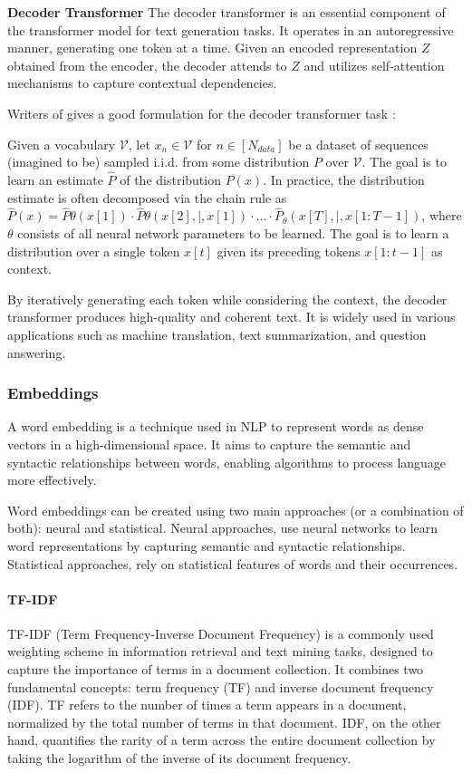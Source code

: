 \documentclass[a4paper,12pt]{article}
\begin{document}
\textbf{Decoder Transformer}
The decoder transformer is an essential component of the transformer model for text generation tasks. It operates in an autoregressive manner, generating one token at a time. Given an encoded representation $Z$ obtained from the encoder, 
the decoder attends to $Z$ and utilizes self-attention mechanisms to capture contextual dependencies.

Writers of \cite{formaltransformer} gives a good formulation for the decoder transformer task : 

Given a vocabulary $\mathcal{V}$, let $x_n \in \mathcal{V}$ for $n \in [N_{data}]$ be a dataset of sequences (imagined to be) sampled i.i.d. from some distribution $P$ over $\mathcal{V}$. 
The goal is to learn an estimate $\hat{P}$ of the distribution $P(x)$. 
In practice, the distribution estimate is often decomposed via the chain rule as $\hat{P}(x) = \hat{P}{\theta}(x[1]) \cdot \hat{P}{\theta}(x[2] ,|, x[1]) \cdot \ldots \cdot \hat{P}_{\theta}(x[T] ,|, x[1:T-1])$, 
where $\theta$ consists of all neural network parameters to be learned. 
The goal is to learn a distribution over a single token $x[t]$ given its preceding tokens $x[1:t-1]$ as context.

By iteratively generating each token while considering the context, the decoder transformer produces high-quality and coherent text. 
It is widely used in various applications such as machine translation, text summarization, and question answering.




\subsubsection{Embeddings}
A word embedding is a technique used in NLP to represent words as dense vectors in a high-dimensional space. It aims to capture the semantic and syntactic relationships between words, enabling algorithms to process language more effectively.

Word embeddings can be created using two main approaches (or a combination of both): neural and statistical. 
Neural approaches, use neural networks to learn word representations by capturing semantic and syntactic relationships. Statistical approaches, rely on statistical features of words and their occurrences.

\paragraph{TF-IDF}
TF-IDF (Term Frequency-Inverse Document Frequency) is a commonly used weighting scheme in information retrieval and text mining tasks, designed to capture the importance of terms in a document collection. It combines two fundamental concepts: term frequency (TF) and inverse document frequency (IDF). TF refers to the number of times a term appears in a document, normalized by the total number of terms in that document. IDF, on the other hand, quantifies the rarity of a term across the entire document collection by taking the logarithm of the inverse of its document frequency. 
\end{document}
